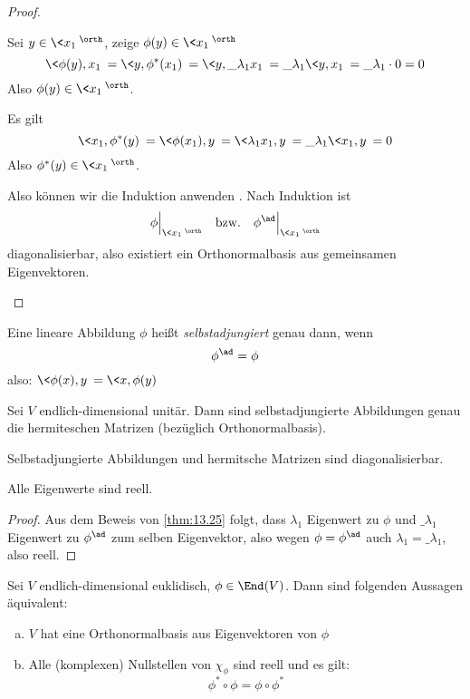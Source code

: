 \documentclass{mycourse}
\begin{document}
\begin{thm}
\begin{proof}
\begin{seg}[„$(b)\implies (a)$“]
			Sei $y\in \<x_1\>^\orth$, zeige $\phi(y)\in \<x_1\>^\orth$
			\[
				\<\phi(y),x_1\> = \<y,\phi^*(x_1)\> = \<y,\_\lambda_1x_1\> = \_\lambda_1 \<y,x_1\> = \_\lambda_1 \cdot 0 = 0
			\]
			Also $\phi(y) \in \<x_1\>^\orth$.

			Es gilt
			\[
				\<x_1,\phi^*(y)\> = \<\phi(x_1),y\> = \<\lambda_1x_1,y\> = \_\lambda_1 \<x_1,y\> = 0
			\]
			Also $\phi^*(y) \in \<x_1\>^\orth$.

			Also können wir die Induktion anwenden .
			Nach Induktion ist
			\[
				\phi\Big|_{\<x_1\>^\orth} \quad \text{bzw.} \quad \phi^{\ad}\Big|_{\<x_1\>^\orth}
			\]
			diagonalisierbar, also existiert ein Orthonormalbasis aus gemeinsamen Eigenvektoren.
		\end{seg}
	\end{proof}
\end{thm}

\begin{df}
	\label{df:13.26}
	Eine lineare Abbildung $\phi$ heißt \emph{selbstadjungiert} genau dann, wenn
	\[
		\phi^{\ad} = \phi
	\]
	also: $\<\phi(x),y\> = \<x,\phi(y)\>$
\end{df}

\begin{kor}[Spektralsatz]
	\label{kor:13.27}
	Sei $V$ endlich-dimensional unitär.
	Dann sind selbstadjungierte Abbildungen genau die hermiteschen Matrizen (bezüglich Orthonormalbasis).

	Selbstadjungierte Abbildungen und hermitsche Matrizen sind diagonalisierbar.

	Alle Eigenwerte sind reell.
	\begin{proof}
		Aus dem Beweis von \ref{thm:13.25} folgt, dass $\lambda_1$ Eigenwert zu $\phi$ und $\_\lambda_1$ Eigenwert zu $\phi^{\ad}$ zum selben Eigenvektor, also wegen $\phi=\phi^{\ad}$ auch $\lambda_1 = \_\lambda_1$, also reell.

		\fixme[Rest?]
	\end{proof}
\end{kor}

\begin{kor}
	\label{kor:13.28}
	Sei $V$ endlich-dimensional euklidisch, $\phi\in \End(V)$.
	Dann sind folgenden Aussagen äquivalent:
	\begin{enumerate}[(a)]
		\item
			$V$ hat eine Orthonormalbasis aus Eigenvektoren von $\phi$
		\item
			Alle (komplexen) Nullstellen von $\chi_\phi$ sind reell und es gilt:
			\[
				\phi^*\circ \phi = \phi\circ \phi^*
			\]
	\end{enumerate}
\end{kor}
\end{document}
